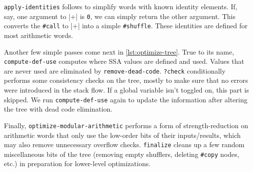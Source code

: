
\Verb|apply-identities| follows to simplify words with known identity elements.
If, say, one argument to \factor|+| is \Verb|0|, we can simply return the other
argument.  This converts the \Verb|#call| to \factor|+| into a simple
\Verb|#shuffle|.  These identities are defined for most arithmetic words.

Another few simple passes come next in \vref{lst:optimize-tree}.  True to its
name, \Verb|compute-def-use| computes where \gls{SSA} values are defined and
used.  Values that are never used are eliminated by \Verb|remove-dead-code|.
\Verb|?check| conditionally performs some consistency checks on the tree,
mostly to make sure that no errors were introduced in the stack flow.  If a
global variable isn't toggled on, this part is skipped.  We run
\Verb|compute-def-use| again to update the information after altering the tree
with dead code elimination.

Finally, \Verb|optimize-modular-arithmetic| performs a form of
strength-reduction on arithmetic words that only use the low-order bits of
their inputs/results, which may also remove unnecessary overflow checks.
\Verb|finalize| cleans up a few random miscellaneous bits of the tree (removing
empty shufflers, deleting \Verb|#copy| nodes, etc.) in preparation for
lower-level optimizations.
